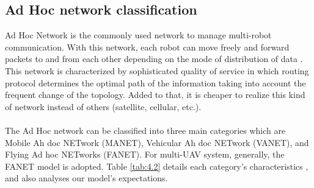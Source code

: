 \documentclass[11pt,openany]{book}
\begin{document}
\subsection{Ad Hoc network classification}
Ad Hoc Network is the commonly used network to manage multi-robot communication. With this network, each robot can move freely and forward packets to and from each other depending on the mode of distribution of data \cite{bouachir2014conception}. This network is characterized by sophisticated quality of service in which routing protocol determines the optimal path of the information taking into account the frequent change of the topology. Added to that, it is cheaper to realize this kind of network instead of others (satellite, cellular, etc.).\\\\
The Ad Hoc network can be classiﬁed into three main categories which are Mobile Ah doc NETwork (MANET), Vehicular Ah doc NETwork (VANET), and Flying Ad hoc NETworks (FANET). For multi-UAV system, generally, the FANET model is adopted. Table \ref{tab:4.2} details each category’s characteristics \cite{bekmezci2013flying}, \cite{maistrenko2016experimental} and also analyses our model’s expectations.
\end{document}
